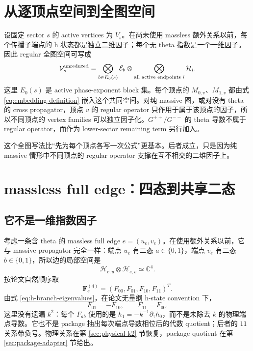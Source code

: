 \documentclass[11pt,a4paper]{ctexart}
\newcommand{\cV}{\mathcal V}
\newcommand{\cE}{\mathcal E}
\newcommand{\cH}{\mathcal H}
\begin{document}
\section{从逐顶点空间到全图空间}

设固定 sector $s$ 的 active vertices 为 $V_s$。在尚未使用 massless 额外关系以前，每个传播子端点的 h 状态都是独立二维因子；每个无 theta 指数是一个一维因子。因此 regular 全图空间可写成
\begin{equation}
 \cV_s^{\rm unreduced}
 =\bigotimes_{b\in E_0(s)}\cE_b
 \otimes
 \bigotimes_{\text{all active endpoints }i}\cH_i.
 \label{eq:global-unreduced-space}
\end{equation}
这里 $E_0(s)$ 是 active phase-exponent block 集。每个顶点的 $M_{0,v}$、$M_{1,v}$ 都由式 \eqref{eq:embedding-definition} 嵌入这个共同空间。对纯 massive 图，或对没有 theta 的 cross propagator，顶点 $v$ 的 regular operator 只作用于属于该顶点的因子，所以不同顶点的 vertex families 可以独立因子化。$G^{++}/G^{--}$ 的 theta 导数不属于 regular operator，而作为 lower-sector remaining term 另行加入。

这个全图写法比“先为每个顶点各写一次公式”更基本。后者成立，只是因为纯 massive 情形中不同顶点的 regular operator 支撑在互不相交的二维因子上。

\section{massless full edge：四态到共享二态}

\subsection{它不是一维指数因子}

考虑一条含 theta 的 massless full edge $e=(u_e,v_e)$。在使用额外关系以前，它与 massive propagator 完全一样：端点 $u_e$ 有二态 $a\in\{0,1\}$，端点 $v_e$ 有二态 $b\in\{0,1\}$，所以边的局部空间是
\begin{equation}
 \cH_{e,u}\otimes\cH_{e,v}\simeq\mathbb C^4.
\end{equation}
按论文自然顺序取
\begin{equation}
 \bm F_e^{(4)}
 =(F_{00},F_{01},F_{10},F_{11})^T.
\end{equation}
由式 \eqref{eq:h-branch-eigenvalues}，在论文无量纲 h-state convention 下，
\begin{equation}
 F_{01}=-F_{10},
 \qquad
 F_{11}=F_{00}.
 \label{eq:h-state-massless-relations}
\end{equation}
这里没有遗漏 $k^2$：每个 $F_{ab}$ 使用的是 $h_1=-k^{-1}\partial_\tau h_0$，而不是未除去 $k$ 的物理端点导数。它也不是 package 抽出每次端点导数相位后的代数 quotient；后者的 $11$ 关系带负号。物理关系在第 \ref{sec:physical-k2} 节恢复，package quotient 在第 \ref{sec:package-adapter} 节给出。
\end{document}
